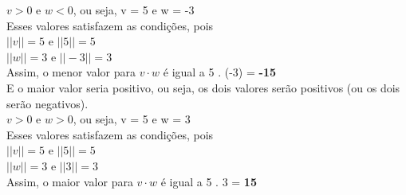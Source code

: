 \documentclass[paper=a4]{article}
\begin{document}
{{	$v > 0$ e $w < 0$, ou seja, v = 5 e w = -3 \\
	\vspace{0,1cm}
	Esses valores satisfazem as condições, pois\\
	\vspace{0,1cm}
	$||v|| = 5$ e $||5|| = 5$\\
	\vspace{0,1cm}
	$||w|| = 3$ e $||-3|| = 3$\\
	\vspace{0,1cm}
	Assim, o menor valor para $v \cdot w$ é igual a 5 . (-3) = \textbf{-15}\\
	\newline
	\vspace{0,3cm}
	E o maior valor seria positivo, ou seja, os dois valores serão positivos (ou os dois serão negativos).\\
	$v > 0$ e $w > 0$, ou seja, v = 5 e w = 3 \\
	\vspace{0,1cm}
	Esses valores satisfazem as condições, pois\\
	\vspace{0,1cm}
	$||v|| = 5$ e $||5|| = 5$\\
	\vspace{0,1cm}
	$||w|| = 3$ e $||3|| = 3$\\
	\vspace{0,1cm}
	Assim, o maior valor para $v \cdot w$ é igual a 5 . 3 = \textbf{15}
	\newpage
	
	
}}
\end{document}
